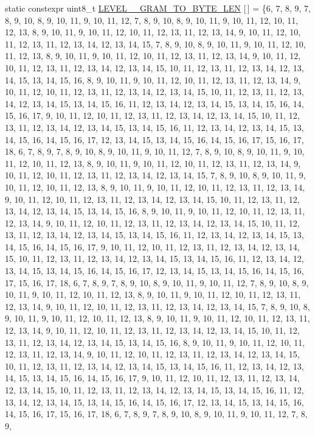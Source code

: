 \begin{DoxyCompactItemize}
static constexpr uint8\+\_\+t \hyperlink{classuva_1_1smt_1_1bpbd_1_1server_1_1lm_1_1m__grams_1_1m__gram__id_1_1_byte___m___gram___id_aab931d9bc7a87784464c2ffce0a00978}{L\+E\+V\+E\+L\+\_\+\_\+\+G\+R\+A\+M\+\_\+\+T\+O\+\_\+\+B\+Y\+T\+E\+\_\+\+L\+E\+N} \mbox{[}$\,$\mbox{]} = \{6, 7, 8, 9, 7, 8, 9, 10, 8, 9, 10, 11, 9, 10, 11, 12, 7, 8, 9, 10, 8, 9, 10, 11, 9, 10, 11, 12, 10, 11, 12, 13, 8, 9, 10, 11, 9, 10, 11, 12, 10, 11, 12, 13, 11, 12, 13, 14, 9, 10, 11, 12, 10, 11, 12, 13, 11, 12, 13, 14, 12, 13, 14, 15, 7, 8, 9, 10, 8, 9, 10, 11, 9, 10, 11, 12, 10, 11, 12, 13, 8, 9, 10, 11, 9, 10, 11, 12, 10, 11, 12, 13, 11, 12, 13, 14, 9, 10, 11, 12, 10, 11, 12, 13, 11, 12, 13, 14, 12, 13, 14, 15, 10, 11, 12, 13, 11, 12, 13, 14, 12, 13, 14, 15, 13, 14, 15, 16, 8, 9, 10, 11, 9, 10, 11, 12, 10, 11, 12, 13, 11, 12, 13, 14, 9, 10, 11, 12, 10, 11, 12, 13, 11, 12, 13, 14, 12, 13, 14, 15, 10, 11, 12, 13, 11, 12, 13, 14, 12, 13, 14, 15, 13, 14, 15, 16, 11, 12, 13, 14, 12, 13, 14, 15, 13, 14, 15, 16, 14, 15, 16, 17, 9, 10, 11, 12, 10, 11, 12, 13, 11, 12, 13, 14, 12, 13, 14, 15, 10, 11, 12, 13, 11, 12, 13, 14, 12, 13, 14, 15, 13, 14, 15, 16, 11, 12, 13, 14, 12, 13, 14, 15, 13, 14, 15, 16, 14, 15, 16, 17, 12, 13, 14, 15, 13, 14, 15, 16, 14, 15, 16, 17, 15, 16, 17, 18, 6, 7, 8, 9, 7, 8, 9, 10, 8, 9, 10, 11, 9, 10, 11, 12, 7, 8, 9, 10, 8, 9, 10, 11, 9, 10, 11, 12, 10, 11, 12, 13, 8, 9, 10, 11, 9, 10, 11, 12, 10, 11, 12, 13, 11, 12, 13, 14, 9, 10, 11, 12, 10, 11, 12, 13, 11, 12, 13, 14, 12, 13, 14, 15, 7, 8, 9, 10, 8, 9, 10, 11, 9, 10, 11, 12, 10, 11, 12, 13, 8, 9, 10, 11, 9, 10, 11, 12, 10, 11, 12, 13, 11, 12, 13, 14, 9, 10, 11, 12, 10, 11, 12, 13, 11, 12, 13, 14, 12, 13, 14, 15, 10, 11, 12, 13, 11, 12, 13, 14, 12, 13, 14, 15, 13, 14, 15, 16, 8, 9, 10, 11, 9, 10, 11, 12, 10, 11, 12, 13, 11, 12, 13, 14, 9, 10, 11, 12, 10, 11, 12, 13, 11, 12, 13, 14, 12, 13, 14, 15, 10, 11, 12, 13, 11, 12, 13, 14, 12, 13, 14, 15, 13, 14, 15, 16, 11, 12, 13, 14, 12, 13, 14, 15, 13, 14, 15, 16, 14, 15, 16, 17, 9, 10, 11, 12, 10, 11, 12, 13, 11, 12, 13, 14, 12, 13, 14, 15, 10, 11, 12, 13, 11, 12, 13, 14, 12, 13, 14, 15, 13, 14, 15, 16, 11, 12, 13, 14, 12, 13, 14, 15, 13, 14, 15, 16, 14, 15, 16, 17, 12, 13, 14, 15, 13, 14, 15, 16, 14, 15, 16, 17, 15, 16, 17, 18, 6, 7, 8, 9, 7, 8, 9, 10, 8, 9, 10, 11, 9, 10, 11, 12, 7, 8, 9, 10, 8, 9, 10, 11, 9, 10, 11, 12, 10, 11, 12, 13, 8, 9, 10, 11, 9, 10, 11, 12, 10, 11, 12, 13, 11, 12, 13, 14, 9, 10, 11, 12, 10, 11, 12, 13, 11, 12, 13, 14, 12, 13, 14, 15, 7, 8, 9, 10, 8, 9, 10, 11, 9, 10, 11, 12, 10, 11, 12, 13, 8, 9, 10, 11, 9, 10, 11, 12, 10, 11, 12, 13, 11, 12, 13, 14, 9, 10, 11, 12, 10, 11, 12, 13, 11, 12, 13, 14, 12, 13, 14, 15, 10, 11, 12, 13, 11, 12, 13, 14, 12, 13, 14, 15, 13, 14, 15, 16, 8, 9, 10, 11, 9, 10, 11, 12, 10, 11, 12, 13, 11, 12, 13, 14, 9, 10, 11, 12, 10, 11, 12, 13, 11, 12, 13, 14, 12, 13, 14, 15, 10, 11, 12, 13, 11, 12, 13, 14, 12, 13, 14, 15, 13, 14, 15, 16, 11, 12, 13, 14, 12, 13, 14, 15, 13, 14, 15, 16, 14, 15, 16, 17, 9, 10, 11, 12, 10, 11, 12, 13, 11, 12, 13, 14, 12, 13, 14, 15, 10, 11, 12, 13, 11, 12, 13, 14, 12, 13, 14, 15, 13, 14, 15, 16, 11, 12, 13, 14, 12, 13, 14, 15, 13, 14, 15, 16, 14, 15, 16, 17, 12, 13, 14, 15, 13, 14, 15, 16, 14, 15, 16, 17, 15, 16, 17, 18, 6, 7, 8, 9, 7, 8, 9, 10, 8, 9, 10, 11, 9, 10, 11, 12, 7, 8, 9, 
\end{DoxyCompactItemize}
